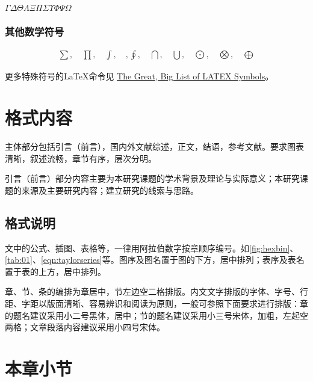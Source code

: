 $\Gamma\Delta\Theta\Lambda\Xi\Pi\Sigma\Upsilon\Phi\Psi\Omega$

\subsubsection{其他数学符号}
\begin{align*}
    \sum, \quad \prod, \quad \int, \quad, \oint, \quad \bigcap, \quad \bigcup, \quad \bigodot, \quad \bigotimes, \quad \bigoplus
\end{align*}

更多特殊符号的\LaTeX{}命令见 \href{https://mirrors.ustc.edu.cn/CTAN/info/symbols/comprehensive/symbols-a4.pdf}{The Great, Big List of LATEX Symbols}。

    


\section{格式内容}

主体部分包括引言（前言），国内外文献综述，正文，结语，参考文献。要求图表清晰，叙述流畅，章节有序，层次分明。

引言（前言）部分内容主要为本研究课题的学术背景及理论与实际意义；本研究课题的来源及主要研究内容；建立研究的线索与思路。

\subsection{格式说明}

文中的公式、插图、表格等，一律用阿拉伯数字按章顺序编号。如\ref{fig:hexbin}、    \ref{tab:01}、\ref{eqn:taylorseries}等。图序及图名置于图的下方，居中排列；表序及表名置于表的上方，居中排列。

章、节、条的编排为章居中，节左边空二格排版。内文文字排版的字体、字号、行距、字距以版面清晰、容易辨识和阅读为原则，一般可参照下面要求进行排版：章的题名建议采用小二号黑体，居中；节的题名建议采用小三号宋体，加粗，左起空两格；文章段落内容建议采用小四号宋体。

\section{本章小节}
